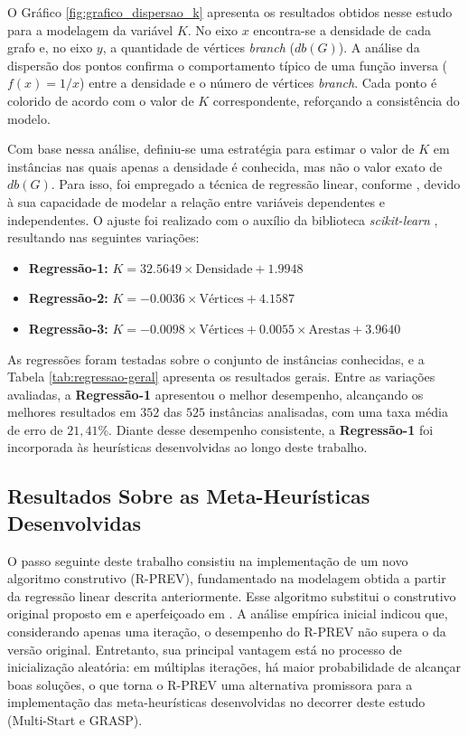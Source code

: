 O Gráfico \ref{fig:grafico_dispersao_k} apresenta os resultados obtidos nesse estudo para a modelagem da variável $K$. No eixo $x$ encontra-se a densidade de cada grafo e, no eixo $y$, a quantidade de vértices \textit{branch} ($db(G)$). A análise da dispersão dos pontos confirma o comportamento típico de uma função inversa ($f(x) = 1/x$) entre a densidade e o número de vértices \textit{branch}. Cada ponto é colorido de acordo com o valor de $K$ correspondente, reforçando a consistência do modelo.

Com base nessa análise, definiu-se uma estratégia para estimar o valor de $K$ em instâncias nas quais apenas a densidade é conhecida, mas não o valor exato de $db(G)$. Para isso, foi empregado a técnica de regressão linear, conforme \cite{seber2003linear}, devido à sua capacidade de modelar a relação entre variáveis dependentes e independentes. O ajuste foi realizado com o auxílio da biblioteca \textit{scikit-learn} \citep{pedregosa2011scikit}, resultando nas seguintes variações:  

\begin{itemize}
    \item \textbf{Regressão-1:} \(K = 32.5649 \times \text{Densidade} + 1.9948\)
    \item \textbf{Regressão-2:} \(K = -0.0036 \times \text{Vértices} + 4.1587\)
    \item \textbf{Regressão-3:} \(K = -0.0098 \times \text{Vértices} + 0.0055 \times \text{Arestas} + 3.9640\)
\end{itemize}

As regressões foram testadas sobre o conjunto de instâncias conhecidas, e a Tabela \ref{tab:regressao-geral} apresenta os resultados gerais. Entre as variações avaliadas, a \textbf{Regressão-1} apresentou o melhor desempenho, alcançando os melhores resultados em $352$ das $525$ instâncias analisadas, com uma taxa média de erro de $21,41$\%. Diante desse desempenho consistente, a \textbf{Regressão-1} foi incorporada às heurísticas desenvolvidas ao longo deste trabalho.





\subsection{Resultados Sobre as Meta-Heurísticas Desenvolvidas}

O passo seguinte deste trabalho consistiu na implementação de um novo algoritmo construtivo (R-PREV), fundamentado na modelagem obtida a partir da regressão linear descrita anteriormente. Esse algoritmo substitui o construtivo original proposto em \cite{morenotese:2018} e aperfeiçoado em \cite{silva2024ils}. A análise empírica inicial indicou que, considerando apenas uma iteração, o desempenho do R-PREV não supera o da versão original. Entretanto, sua principal vantagem está no processo de inicialização aleatória: em múltiplas iterações, há maior probabilidade de alcançar boas soluções, o que torna o R-PREV uma alternativa promissora para a implementação das meta-heurísticas desenvolvidas no decorrer deste estudo (Multi-Start e GRASP).

